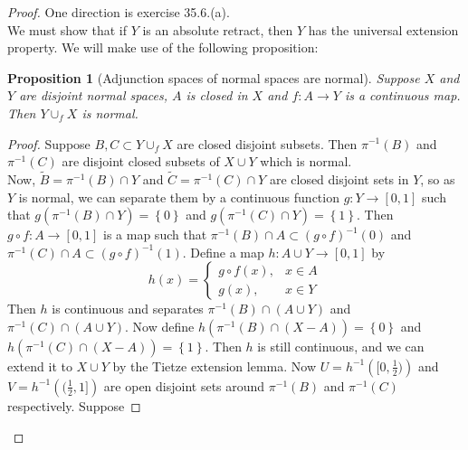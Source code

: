 \documentclass[reqno]{amsart}
\theoremstyle{plain}%
\newtheorem{proposition}[theorem]{Proposition}
\theoremstyle{definition}
\theoremstyle{remark}
\begin{document}
\begin{proof}
    One direction is exercise 35.6.(a).\\
    We must show that if $Y$ is an absolute retract, then $Y$ has the universal
    extension property. We will make use of the following proposition:

    \begin{proposition}[Adjunction spaces of normal spaces are normal]
    Suppose $X$ and $Y$ are disjoint normal spaces, $A$ is closed in $X$ and
    $f  \colon A \to Y$ is a continuous map.
    Then $Y \cup_f X$ is normal.
    \end{proposition}

    \begin{proof}
        Suppose $B,C \subset Y \cup_f X$ are closed disjoint subsets.
        Then $\pi^{-1}(B)$ and $\pi^{-1}(C)$ are disjoint closed subsets
        of $X \cup Y$ which is normal. \\
        Now, $\tilde{B} = \pi^{-1}(B) \cap Y$ and $\tilde{ C }= 
        \pi^{-1}(C) \cap Y$ are closed disjoint sets
        in $Y$, so as $Y$ is normal, we can separate them by a continuous
        function
        $g  \colon Y \to \left[ 0,1 \right] $ such that
        $g\left( \pi^{-1}(B) \cap Y \right) = \left\{ 0 \right\} $ and
        $g \left( \pi^{-1}(C) \cap Y \right) = \left\{ 1 \right\} $. Then
        $g \circ f  \colon A \to \left[ 0,1 \right] $ is a map such that
         $\pi^{-1}(B) \cap A \subset  \left( g \circ f \right)^{-1} \left( 0 \right) $
         and $\pi^{-1}(C) \cap A \subset 
         \left( g \circ f \right)^{-1} \left( 1 \right) $.
         Define a map $h  \colon A \cup Y \to \left[ 0,1 \right] $ by
         \[
         h(x) = \begin{cases}
             g \circ f (x),& x \in A\\
             g (x),& x \in Y
         \end{cases}
         \] 
         Then $h$ is continuous and separates
         $\pi^{-1}(B) \cap \left( A \cup Y \right) $ and
         $\pi^{-1}(C) \cap  \left( A \cup Y \right) $. 
         Now define $h \left( \pi^{-1}(B) \cap (X-A) \right) = \left\{ 0 \right\} $ 
         and $h \left( \pi^{-1}(C) \cap (X-A) \right) = \left\{ 1 \right\} $.
         Then
         $h$ is still continuous, and we can extend it to
         $X \cup Y$ by the Tietze extension lemma.
         Now $U = h^{-1}\left( [0,\frac{1}{2}) \right) $ and
         $V = h^{-1}\left( (\frac{1}{2},1] \right) $ are open disjoint sets
         around $\pi^{-1}(B)$ and $\pi^{-1}(C)$ respectively. Suppose

\end{proof}
\end{proof}
\end{document}

